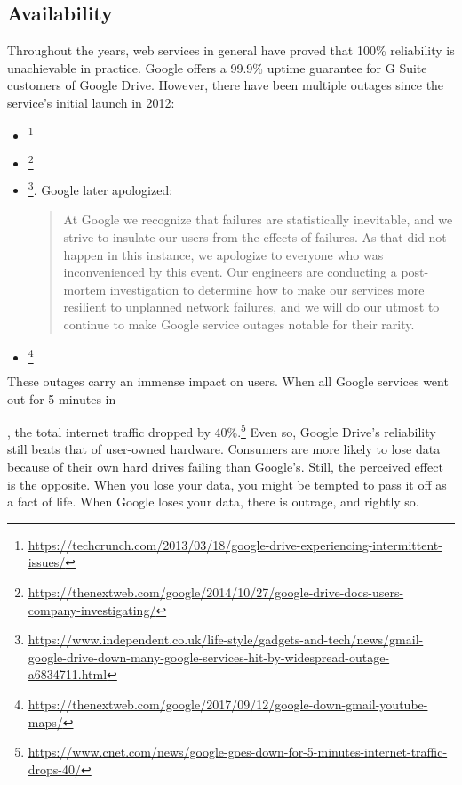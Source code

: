 \subsection{Availability}

Throughout the years, web services in general have proved that 100\% reliability is unachievable in practice. Google offers a 99.9\% uptime guarantee for G Suite customers of Google Drive. However, there have been multiple outages since the service's initial launch in 2012:

\begin{itemize}
  \item \date{March 2013}\footnote{\url{https://techcrunch.com/2013/03/18/google-drive-experiencing-intermittent-issues/}}
  \item \date{October 2014}\footnote{\url{https://thenextweb.com/google/2014/10/27/google-drive-docs-users-company-investigating/}}
  \item \date{January 2016}\footnote{\url{https://www.independent.co.uk/life-style/gadgets-and-tech/news/gmail-google-drive-down-many-google-services-hit-by-widespread-outage-a6834711.html}}. Google later apologized:
    \begin{quote}
      At Google we recognize that failures are statistically inevitable, and we strive to insulate our users from the effects of failures. As that did not happen in this instance, we apologize to everyone who was inconvenienced by this event. Our engineers are conducting a post-mortem investigation to determine how to make our services more resilient to unplanned network failures, and we will do our utmost to continue to make Google service outages notable for their rarity.
    \end{quote}
  \item \date{September 2017}\footnote{\url{https://thenextweb.com/google/2017/09/12/google-down-gmail-youtube-maps/}}
\end{itemize}

These outages carry an immense impact on users. When all Google services went out for 5 minutes in \date{August 2013}, the total internet traffic dropped by 40\%.\footnote{\url{https://www.cnet.com/news/google-goes-down-for-5-minutes-internet-traffic-drops-40/}} Even so, Google Drive's reliability still beats that of user-owned hardware. Consumers are more likely to lose data because of their own hard drives failing than Google's. Still, the perceived effect is the opposite. When you lose your data, you might be tempted to pass it off as a fact of life. When Google loses your data, there is outrage, and rightly so.

